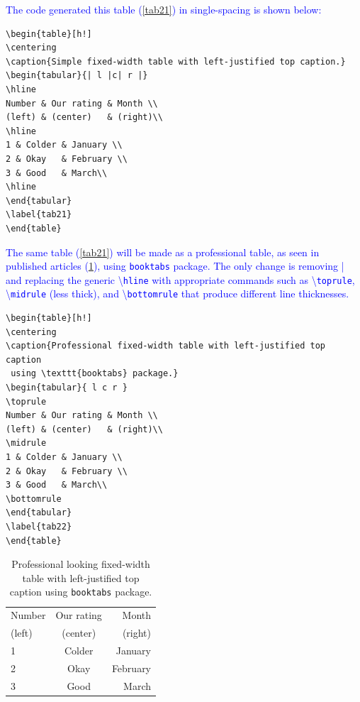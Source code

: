 \documentclass[phd]{ndsu-thesis-2022}
\newcommand\italk[1]{\textcolor{blue}{#1}}  %
\newcommand\cmd[1]{\textbackslash\texttt{#1}}  %
\begin{document}
\italk{The code generated this table (\cref{tab21}) in single-spacing is shown below:}

{\singlespacing
\begin{verbatim}
\begin{table}[h!]
\centering
\caption{Simple fixed-width table with left-justified top caption.}
\begin{tabular}{| l |c| r |}
\hline
Number & Our rating & Month \\
(left) & (center)   & (right)\\
\hline
1 & Colder & January \\
2 & Okay   & February \\
3 & Good   & March\\
\hline
\end{tabular}
\label{tab21}
\end{table}
\end{verbatim}
}

\italk{The same table (\cref{tab21}) will be made as a professional table, as seen in published articles (\cref{tab22}), using \texttt{booktabs} package. The only change is removing | and replacing the generic \cmd{hline} with appropriate commands such as \cmd{toprule}, \cmd{midrule} (less thick), and \cmd{bottomrule} that produce different line thicknesses.
}

{\singlespacing
\begin{verbatim}
\begin{table}[h!]
\centering
\caption{Professional fixed-width table with left-justified top caption
 using \texttt{booktabs} package.}
\begin{tabular}{ l c r }
\toprule
Number & Our rating & Month \\
(left) & (center)   & (right)\\
\midrule
1 & Colder & January \\
2 & Okay   & February \\
3 & Good   & March\\
\bottomrule
\end{tabular}
\label{tab22}
\end{table}
\end{verbatim}
}
\label{tabcode22}

\begin{table}[ht!]
\centering
\caption{Professional looking fixed-width table with left-justified top caption using \texttt{booktabs} package.}
\begin{tabular}{ l c r }
\toprule
Number & Our rating & Month \\
(left) & (center)   & (right)\\
\midrule
1 & Colder & January \\
2 & Okay   & February \\
3 & Good   & March\\
\bottomrule
\end{tabular}
\label{tab22}
\end{table}
\end{document}
